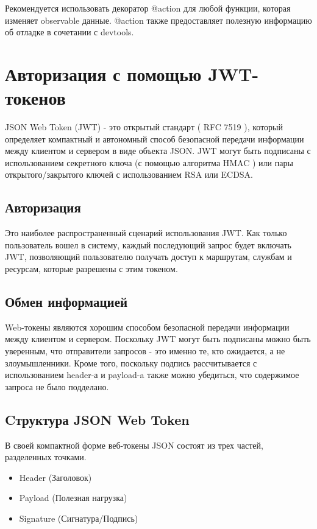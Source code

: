 \documentclass[14pt, a4paper]{diplom}
\begin{document}
Рекомендуется использовать декоратор @action для любой функции, которая изменяет observable данные. @action также предоставляет полезную информацию об отладке в сочетании с devtools.

\section{Авторизация с помощью JWT-токенов}

JSON Web Token (JWT) - это открытый стандарт ( RFC 7519 ), который определяет компактный и автономный способ безопасной передачи информации между клиентом и сервером в виде объекта JSON. 
JWT могут быть подписаны с использованием секретного ключа (с помощью алгоритма HMAC ) или пары открытого/закрытого ключей с использованием RSA или ECDSA.

\subsection{Авторизация}
Это наиболее распространенный сценарий использования JWT. Как только пользователь вошел в систему, каждый последующий запрос будет включать JWT, позволяющий пользователю получать доступ к маршрутам, службам и ресурсам, которые разрешены с этим токеном. 

\subsection{Обмен информацией}
Web-токены являются хорошим способом безопасной передачи информации между клиентом и сервером. Поскольку JWT могут быть подписаны можно быть уверенным, что отправители запросов - это именно те, кто ожидается, а не злоумышленники. Кроме того, поскольку подпись рассчитывается с использованием header-а и payload-a также можно убедиться, что содержимое запроса не было подделано.

\subsection{Cтруктура JSON Web Token}

В своей компактной форме веб-токены JSON состоят из трех частей, разделенных точками.

\begin{itemize}
  \item Header (Заголовок)
  \item Payload (Полезная нагрузка)
  \item Signature (Сигнатура/Подпись)
\end{itemize}
\end{document}
